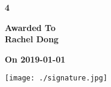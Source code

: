 \documentclass{letter}
\begin{document}
\thispagestyle{empty}
\begin{landscape}
\begin{center}

\Huge \textbf{4\\[0.5in]} \par

\large \textbf{Awarded To}
\Huge \textbf{\\Rachel Dong\\[0.4in]} \par
\large \textbf{On 2019-01-01}

\texttt{[image: ./signature.jpg]}\\[1mm]
\vspace{-2cm}{\rule[0.6in]{4in}{.1pt}}

\end{center}
\end{landscape}
\end{document}
